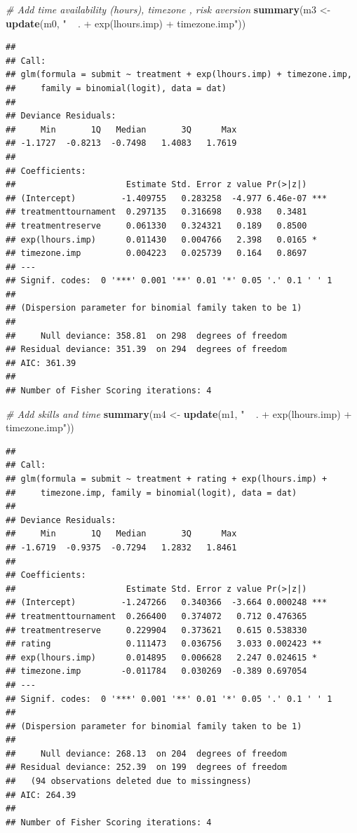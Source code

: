 \documentclass[]{article}
\newenvironment{Shaded}{\begin{snugshade}}{\end{snugshade}}
\newcommand{\KeywordTok}[1]{\textcolor[rgb]{0.13,0.29,0.53}{\textbf{#1}}}
\newcommand{\StringTok}[1]{\textcolor[rgb]{0.31,0.60,0.02}{#1}}
\newcommand{\CommentTok}[1]{\textcolor[rgb]{0.56,0.35,0.01}{\textit{#1}}}
\newcommand{\NormalTok}[1]{#1}
\let\oldShaded\Shaded
\let\endoldShaded\endShaded
\renewenvironment{Shaded}{\footnotesize\oldShaded}{\endoldShaded}
\begin{document}
\begin{Shaded}
\begin{Highlighting}[]
\CommentTok{# Add time availability (hours), timezone , risk aversion}
\KeywordTok{summary}\NormalTok{(m3 <-}\StringTok{ }\KeywordTok{update}\NormalTok{(m0, }\StringTok{" ~ . + exp(lhours.imp) + timezone.imp"}\NormalTok{))}
\end{Highlighting}
\end{Shaded}

\begin{verbatim}
## 
## Call:
## glm(formula = submit ~ treatment + exp(lhours.imp) + timezone.imp, 
##     family = binomial(logit), data = dat)
## 
## Deviance Residuals: 
##     Min       1Q   Median       3Q      Max  
## -1.1727  -0.8213  -0.7498   1.4083   1.7619  
## 
## Coefficients:
##                      Estimate Std. Error z value Pr(>|z|)    
## (Intercept)         -1.409755   0.283258  -4.977 6.46e-07 ***
## treatmenttournament  0.297135   0.316698   0.938   0.3481    
## treatmentreserve     0.061330   0.324321   0.189   0.8500    
## exp(lhours.imp)      0.011430   0.004766   2.398   0.0165 *  
## timezone.imp         0.004223   0.025739   0.164   0.8697    
## ---
## Signif. codes:  0 '***' 0.001 '**' 0.01 '*' 0.05 '.' 0.1 ' ' 1
## 
## (Dispersion parameter for binomial family taken to be 1)
## 
##     Null deviance: 358.81  on 298  degrees of freedom
## Residual deviance: 351.39  on 294  degrees of freedom
## AIC: 361.39
## 
## Number of Fisher Scoring iterations: 4
\end{verbatim}

\begin{Shaded}
\begin{Highlighting}[]
\CommentTok{# Add skills and time}
\KeywordTok{summary}\NormalTok{(m4 <-}\StringTok{ }\KeywordTok{update}\NormalTok{(m1, }\StringTok{" ~ . + exp(lhours.imp) + timezone.imp"}\NormalTok{))}
\end{Highlighting}
\end{Shaded}

\begin{verbatim}
## 
## Call:
## glm(formula = submit ~ treatment + rating + exp(lhours.imp) + 
##     timezone.imp, family = binomial(logit), data = dat)
## 
## Deviance Residuals: 
##     Min       1Q   Median       3Q      Max  
## -1.6719  -0.9375  -0.7294   1.2832   1.8461  
## 
## Coefficients:
##                      Estimate Std. Error z value Pr(>|z|)    
## (Intercept)         -1.247266   0.340366  -3.664 0.000248 ***
## treatmenttournament  0.266400   0.374072   0.712 0.476365    
## treatmentreserve     0.229904   0.373621   0.615 0.538330    
## rating               0.111473   0.036756   3.033 0.002423 ** 
## exp(lhours.imp)      0.014895   0.006628   2.247 0.024615 *  
## timezone.imp        -0.011784   0.030269  -0.389 0.697054    
## ---
## Signif. codes:  0 '***' 0.001 '**' 0.01 '*' 0.05 '.' 0.1 ' ' 1
## 
## (Dispersion parameter for binomial family taken to be 1)
## 
##     Null deviance: 268.13  on 204  degrees of freedom
## Residual deviance: 252.39  on 199  degrees of freedom
##   (94 observations deleted due to missingness)
## AIC: 264.39
## 
## Number of Fisher Scoring iterations: 4
\end{verbatim}
\end{document}
